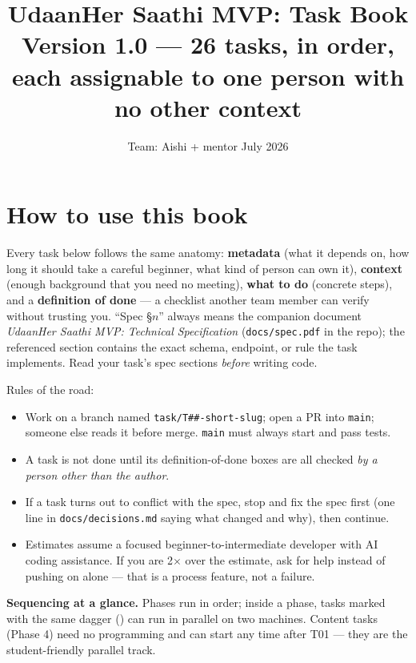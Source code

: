 \documentclass[11pt]{article}
\title{\textbf{UdaanHer Saathi MVP: Task Book}\\
\large Version 1.0 --- 26 tasks, in order, each assignable to one person with no other context}
\author{Team: Aishi + mentor \quad\textbullet\quad 9 July 2026}
\date{}
\newcommand{\code}[1]{\texttt{#1}}
\begin{document}
\maketitle

\tableofcontents

\section{How to use this book}

Every task below follows the same anatomy: \textbf{metadata} (what it depends on, how long it should take a careful beginner, what kind of person can own it), \textbf{context} (enough background that you need no meeting), \textbf{what to do} (concrete steps), and a \textbf{definition of done} --- a checklist another team member can verify without trusting you. ``Spec \S$n$'' always means the companion document \emph{UdaanHer Saathi MVP: Technical Specification} (\code{docs/spec.pdf} in the repo); the referenced section contains the exact schema, endpoint, or rule the task implements. Read your task's spec sections \emph{before} writing code.

Rules of the road:

\begin{itemize}
  \item Work on a branch named \code{task/T\#\#-short-slug}; open a PR into \code{main}; someone else reads it before merge. \code{main} must always start and pass tests.
  \item A task is not done until its definition-of-done boxes are all checked \emph{by a person other than the author}.
  \item If a task turns out to conflict with the spec, stop and fix the spec first (one line in \code{docs/decisions.md} saying what changed and why), then continue.
  \item Estimates assume a focused beginner-to-intermediate developer with AI coding assistance. If you are 2$\times$ over the estimate, ask for help instead of pushing on alone --- that is a process feature, not a failure.
\end{itemize}

\textbf{Sequencing at a glance.} Phases run in order; inside a phase, tasks marked with the same dagger (\dag) can run in parallel on two machines. Content tasks (Phase 4) need no programming and can start any time after T01 --- they are the student-friendly parallel track.
\end{document}
